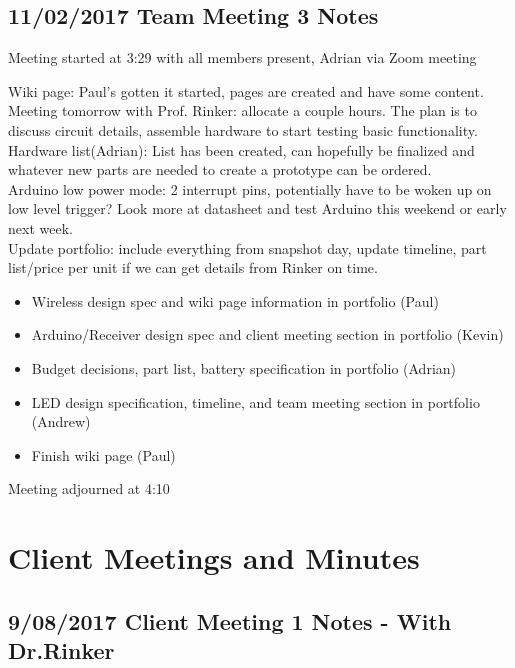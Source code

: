 \documentclass[12pt]{article}
\begin{document}
	\clearpage
	\subsection{11/02/2017 Team Meeting 3 Notes}
	Meeting started at 3:29 with all members present, Adrian via Zoom meeting

	\noindent
	Wiki page: Paul’s gotten it started, pages are created and have some content.\\
	
	\noindent
	Meeting tomorrow with Prof. Rinker: allocate a couple hours. The plan is to discuss circuit details, 		assemble hardware to start testing basic functionality.\\ 
	
	\noindent
	Hardware list(Adrian): List has been created, can hopefully be finalized and whatever new parts are 		needed 	to create a prototype can be ordered.\\
	
	\noindent
	Arduino low power mode: 2 interrupt pins, potentially have to be woken up on low level trigger? Look 		more at datasheet and test Arduino this weekend or early next week.\\
	
	\noindent
	Update portfolio: include everything from snapshot day, update timeline, part list/price per unit if we 	can get details from Rinker on time.\\
\begin{itemize}
\item Wireless design spec and wiki page information in portfolio (Paul)
\item Arduino/Receiver design spec and client meeting section in portfolio (Kevin)
\item  Budget decisions, part list, battery specification in portfolio (Adrian)
\item LED design specification, timeline, and team meeting section in portfolio (Andrew)
\item Finish wiki page (Paul)\\
\end{itemize}

Meeting adjourned at 4:10

\clearpage


\section{Client Meetings and Minutes}

	\subsection{9/08/2017 Client Meeting 1 Notes - With Dr.Rinker}
\end{document}

